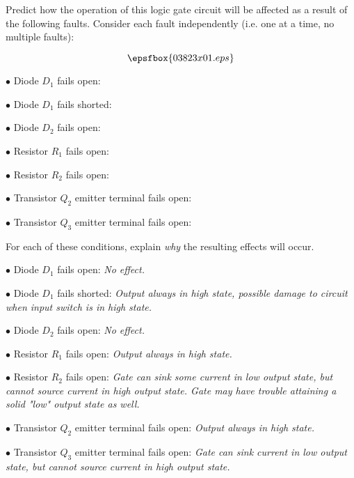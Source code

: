 

Predict how the operation of this logic gate circuit will be affected as a result of the following faults.  Consider each fault independently (i.e. one at a time, no multiple faults):

$$\epsfbox{03823x01.eps}$$

\medskip
\item{$\bullet$} Diode $D_1$ fails open:
\vskip 5pt
\item{$\bullet$} Diode $D_1$ fails shorted:
\vskip 5pt
\item{$\bullet$} Diode $D_2$ fails open:
\vskip 5pt
\item{$\bullet$} Resistor $R_1$ fails open:
\vskip 5pt
\item{$\bullet$} Resistor $R_2$ fails open:
\vskip 5pt
\item{$\bullet$} Transistor $Q_2$ emitter terminal fails open:
\vskip 5pt
\item{$\bullet$} Transistor $Q_3$ emitter terminal fails open:
\medskip

For each of these conditions, explain {\it why} the resulting effects will occur.







\medskip
\item{$\bullet$} Diode $D_1$ fails open: {\it No effect.}
\vskip 5pt
\item{$\bullet$} Diode $D_1$ fails shorted: {\it Output always in high state, possible damage to circuit when input switch is in high state.}
\vskip 5pt
\item{$\bullet$} Diode $D_2$ fails open: {\it No effect.}
\vskip 5pt
\item{$\bullet$} Resistor $R_1$ fails open: {\it Output always in high state.}
\vskip 5pt
\item{$\bullet$} Resistor $R_2$ fails open: {\it Gate can sink some current in low output state, but cannot source current in high output state.  Gate may have trouble attaining a solid "low" output state as well.}
\vskip 5pt
\item{$\bullet$} Transistor $Q_2$ emitter terminal fails open: {\it Output always in high state.}
\vskip 5pt
\item{$\bullet$} Transistor $Q_3$ emitter terminal fails open: {\it Gate can sink current in low output state, but cannot source current in high output state.}
\medskip


